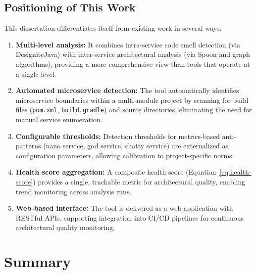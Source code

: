              \subsection{Positioning of This Work}
             \label{subsec:positioning}

             \indent\par This dissertation differentiates itself from existing work in several ways:

             \begin{enumerate}
                 \item \textbf{Multi-level analysis:} It combines intra-service code smell detection (via DesigniteJava) with inter-service architectural analysis (via Spoon and graph algorithms), providing a more comprehensive view than tools that operate at a single level.
                 \item \textbf{Automated microservice detection:} The tool automatically identifies microservice boundaries within a multi-module project by scanning for build files (\texttt{pom.xml}, \texttt{build.gradle}) and source directories, eliminating the need for manual service enumeration.
                 \item \textbf{Configurable thresholds:} Detection thresholds for metrics-based anti-patterns (nano service, god service, chatty service) are externalized as configuration parameters, allowing calibration to project-specific norms.
                 \item \textbf{Health score aggregation:} A composite health score (Equation~\ref{eq:health-score}) provides a single, trackable metric for architectural quality, enabling trend monitoring across analysis runs.
                 \item \textbf{Web-based interface:} The tool is delivered as a web application with RESTful APIs, supporting integration into CI/CD pipelines for continuous architectural quality monitoring.
             \end{enumerate}

             \section{Summary}
             \label{sec:ch2-summary}

